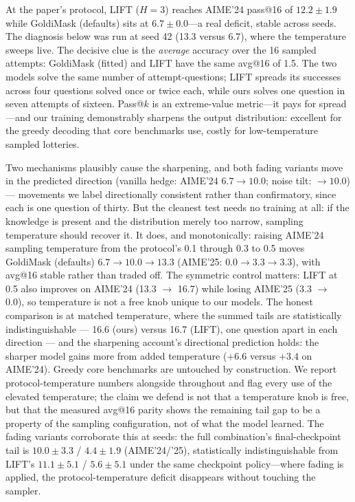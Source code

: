 \documentclass{article} %
\begin{document}
At the paper's protocol, LIFT ($H{=}3$) reaches AIME'24 pass@16 of $12.2 \pm 1.9$ while GoldiMask (defaults) sits at $6.7 \pm 0.0$---a real deficit, stable across seeds. The diagnosis below was run at seed 42 (13.3 versus 6.7), where the temperature sweeps live. The decisive clue is the \emph{average} accuracy over the 16 sampled attempts: GoldiMask (fitted) and LIFT have the same avg@16 of 1.5. The two models solve the same number of attempt-questions; LIFT spreads its successes across four questions solved once or twice each, while ours solves one question in seven attempts of sixteen. Pass@$k$ is an extreme-value metric---it pays for spread---and our training demonstrably sharpens the output distribution: excellent for the greedy decoding that core benchmarks use, costly for low-temperature sampled lotteries.

Two mechanisms plausibly cause the sharpening, and both fading variants move in the predicted direction (vanilla hedge: AIME'24 $6.7 \to 10.0$; noise tilt: $\to 10.0$) --- movements we label directionally consistent rather than confirmatory, since each is one question of thirty. But the cleanest test needs no training at all: if the knowledge is present and the distribution merely too narrow, sampling temperature should recover it. It does, and monotonically: raising AIME'24 sampling temperature from the protocol's 0.1 through 0.3 to 0.5 moves GoldiMask (defaults) $6.7 \to 10.0 \to 13.3$ (AIME'25: $0.0 \to 3.3 \to 3.3$), with avg@16 stable rather than traded off. The symmetric control matters: LIFT at 0.5 also improves on AIME'24 (13.3 $\to$ 16.7) while losing AIME'25 (3.3 $\to$ 0.0), so temperature is not a free knob unique to our models. The honest comparison is at matched temperature, where the summed tails are statistically indistinguishable --- 16.6 (ours) versus 16.7 (LIFT), one question apart in each direction --- and the sharpening account's directional prediction holds: the sharper model gains more from added temperature ($+6.6$ versus $+3.4$ on AIME'24). Greedy core benchmarks are untouched by construction. We report protocol-temperature numbers alongside throughout and flag every use of the elevated temperature; the claim we defend is not that a temperature knob is free, but that the measured avg@16 parity shows the remaining tail gap to be a property of the sampling configuration, not of what the model learned. The fading variants corroborate this at seeds: the full combination's final-checkpoint tail is $10.0 \pm 3.3$ / $4.4 \pm 1.9$ (AIME'24/'25), statistically indistinguishable from LIFT's $11.1 \pm 5.1$ / $5.6 \pm 5.1$ under the same checkpoint policy---where fading is applied, the protocol-temperature deficit disappears without touching the sampler.
\end{document}

